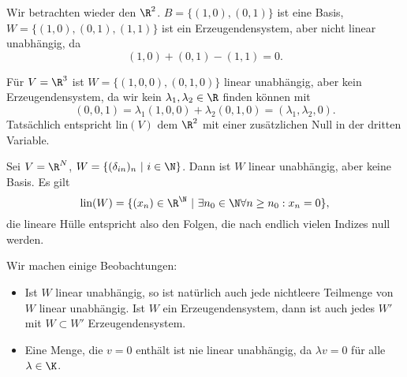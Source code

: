 \label{vektorraeume/vektorraeume:example-6}
\begin{example}{}{}



Wir betrachten wieder den \(\R^2\). \(B=\{(1,0),(0,1)\}\) ist eine Basis, \(W= \{(1,0),(0,1),(1,1)\}\) ist ein Erzeugendensystem, aber nicht linear unabhängig, da
\begin{equation*}
 (1,0) + (0,1) - (1,1) = 0.
\end{equation*}\end{example}
\label{vektorraeume/vektorraeume:example-7}
\begin{example}{}{}



Für \(V=\R^3\) ist \(W=\{(1,0,0),(0,1,0)\}\)  linear unabhängig, aber kein Erzeugendensystem, da wir kein \(\lambda_1,\lambda_2 \in \R\) finden können mit
\begin{equation*}
(0,0,1) =  \lambda_1 (1,0,0)+ \lambda_2 (0,1,0) = (\lambda_1,\lambda_2,0).
\end{equation*}
Tatsächlich entspricht lin\((V)\) dem \(\R^2\) mit einer zusätzlichen Null in der dritten Variable.
\end{example}
\label{vektorraeume/vektorraeume:example-8}
\begin{example}{}{}



Sei \(V=\R^N\), \(W=\{(\delta_{in})_n ~|~i \in \N\}\). Dann ist \(W\) linear unabhängig, aber keine Basis. Es gilt
\begin{equation*}
 \text{lin}(W) = \{ (x_n) \in \R^\N~|~ \exists n_0 \in \N \forall n \geq n_0: x_n =0 \},
\end{equation*}
die lineare Hülle entspricht also den Folgen, die nach endlich vielen Indizes null werden.
\end{example}

Wir machen einige Beobachtungen:
\begin{itemize}
\item {} 
Ist \(W\) linear unabhängig, so ist natürlich auch jede nichtleere Teilmenge von \(W\) linear unabhängig. Ist \(W\) ein Erzeugendensystem, dann ist auch jedes \(W'\) mit \(W \subset W'\) Erzeugendensystem.

\item {} 
Eine Menge, die \(v=0\) enthält ist nie linear unabhängig, da \(\lambda   v  = 0\) für alle \(\lambda \in \K\).

\end{itemize}


